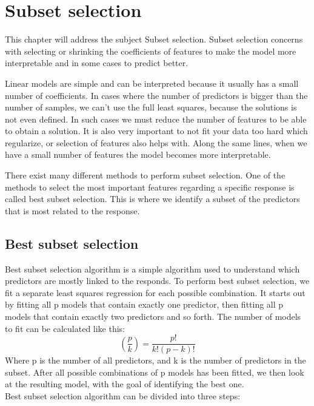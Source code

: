 \graphicspath{{Chapters/Indledning/}}

\chapter{Subset selection}

This chapter will address the subject Subset selection. Subset selection concerns with selecting or shrinking the coefficients of features to make the model more interpretable and in some cases to predict better.

Linear models are simple and can be interpreted because it usually has a small number of coefficients.
In cases where the number of predictors is bigger than the number of samples, we can’t use the full least squares, because the solutions is not even defined. In such cases we must reduce the number of features to be able to obtain a solution. It is also very important to not fit your data too hard which regularize, or selection of features also helps with. Along the same lines, when we have a small number of features the model becomes more interpretable.  

There exist many different methods to perform subset selection. One of the methods to select the most important features regarding a specific response is called best subset selection. This is where we identify a subset of the predictors that is most related to the response. 

\section{Best subset selection}

Best subset selection algorithm is a simple algorithm used to understand which predictors are mostly linked to the responds. To perform best subset selection, we fit a separate least squares regression for each possible combination. It starts out by fitting all p models that contain exactly one predictor, then fitting all p models that contain exactly two predictors and so forth. The number of models to fit can be calculated like this: 
\begin{equation}
(\frac{p}{k})=\frac{p!}{k!(p-k)!}\label{Best_subset_models_eq}
\end{equation}
Where p is the number of all predictors, and k is the number of predictors in the subset. After all possible combinations of p models has been fitted, we then look at the resulting model, with the goal of identifying the best one. \\
Best subset selection algorithm can be divided into three steps:

